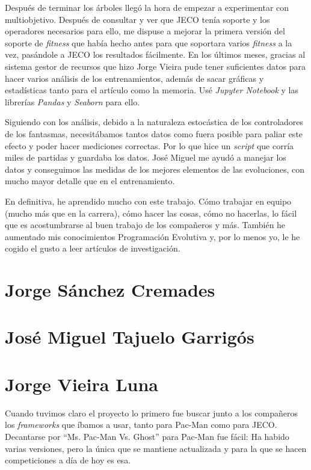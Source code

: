 Después de terminar los árboles llegó la hora de empezar a experimentar con multiobjetivo. Después de consultar y ver que JECO tenía soporte y los operadores necesarios para ello, me dispuse a mejorar la primera versión del soporte de \textit{fitness} que había hecho antes para que soportara varios \textit{fitness} a la vez, pasándole a JECO los resultados fácilmente.
En los últimos meses, gracias al sistema gestor de recursos que hizo Jorge Vieira pude tener suficientes datos para hacer varios análisis de los entrenamientos, además de sacar gráficas y estadísticas tanto para el artículo como la memoria. Usé \textit{Jupyter Notebook} y las librerías \textit{Pandas} y \textit{Seaborn} para ello.

Siguiendo con los análisis, debido a la naturaleza estocástica de los controladores de los fantasmas, necesitábamos tantos datos como fuera posible para paliar este efecto y poder hacer mediciones correctas. Por lo que hice un \textit{script} que corría miles de partidas y guardaba los datos. José Miguel me ayudó a manejar los datos y conseguimos las medidas de los mejores elementos de las evoluciones, con mucho mayor detalle que en el entrenamiento.

En definitiva, he aprendido mucho con este trabajo. Cómo trabajar en equipo (mucho más que en la carrera), cómo hacer las cosas, cómo no hacerlas, lo fácil que es acostumbrarse al buen trabajo de los compañeros y más. También he aumentado mis conocimientos Programación Evolutiva y, por lo menos yo, le he cogido el gusto a leer artículos de investigación.

\section{Jorge Sánchez Cremades}

\section{José Miguel Tajuelo Garrigós}

\section{Jorge Vieira Luna}
Cuando tuvimos claro el proyecto lo primero fue buscar junto a los compañeros los \textit{frameworks} que íbamos a usar, tanto para Pac-Man como para JECO. Decantarse por ``Ms. Pac-Man Vs. Ghost'' para Pac-Man fue fácil: Ha habido varias versiones, pero la única que se mantiene actualizada y para la que se hacen competiciones a día de hoy es esa.

